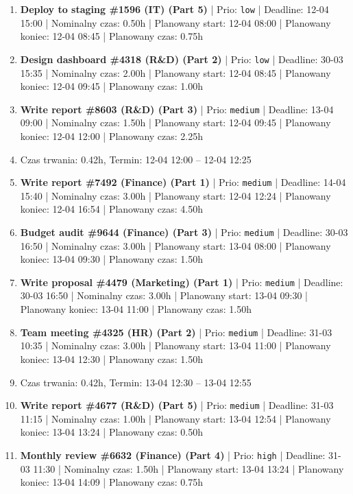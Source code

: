 {\begin{enumerate}
  \item [\textbf{14692}] \textbf{Deploy to staging \#1596 (IT) (Part 5)} | Prio: \texttt{low} | Deadline: 12-04 15:00 | Nominalny czas: 0.50h | Planowany start: 12-04 08:00 | Planowany koniec: 12-04 08:45 | Planowany czas: 0.75h
  \item [\textbf{14691}] \textbf{Design dashboard \#4318 (R\&D) (Part 2)} | Prio: \texttt{low} | Deadline: 30-03 15:35 | Nominalny czas: 2.00h | Planowany start: 12-04 08:45 | Planowany koniec: 12-04 09:45 | Planowany czas: 1.00h
  \item [\textbf{14634}] \textbf{Write report \#8603 (R\&D) (Part 3)} | Prio: \texttt{medium} | Deadline: 13-04 09:00 | Nominalny czas: 1.50h | Planowany start: 12-04 09:45 | Planowany koniec: 12-04 12:00 | Planowany czas: 2.25h
  \item [\textbf{PRZERWA}] Czas trwania: 0.42h, Termin: 12-04 12:00 -- 12-04 12:25
  \item [\textbf{14642}] \textbf{Write report \#7492 (Finance) (Part 1)} | Prio: \texttt{medium} | Deadline: 14-04 15:40 | Nominalny czas: 3.00h | Planowany start: 12-04 12:24 | Planowany koniec: 12-04 16:54 | Planowany czas: 4.50h
  \item [\textbf{14659}] \textbf{Budget audit \#9644 (Finance) (Part 3)} | Prio: \texttt{medium} | Deadline: 30-03 16:50 | Nominalny czas: 3.00h | Planowany start: 13-04 08:00 | Planowany koniec: 13-04 09:30 | Planowany czas: 1.50h
  \item [\textbf{14660}] \textbf{Write proposal \#4479 (Marketing) (Part 1)} | Prio: \texttt{medium} | Deadline: 30-03 16:50 | Nominalny czas: 3.00h | Planowany start: 13-04 09:30 | Planowany koniec: 13-04 11:00 | Planowany czas: 1.50h
  \item [\textbf{14641}] \textbf{Team meeting \#4325 (HR) (Part 2)} | Prio: \texttt{medium} | Deadline: 31-03 10:35 | Nominalny czas: 3.00h | Planowany start: 13-04 11:00 | Planowany koniec: 13-04 12:30 | Planowany czas: 1.50h
  \item [\textbf{PRZERWA}] Czas trwania: 0.42h, Termin: 13-04 12:30 -- 13-04 12:55
  \item [\textbf{14640}] \textbf{Write report \#4677 (R\&D) (Part 5)} | Prio: \texttt{medium} | Deadline: 31-03 11:15 | Nominalny czas: 1.00h | Planowany start: 13-04 12:54 | Planowany koniec: 13-04 13:24 | Planowany czas: 0.50h
  \item [\textbf{14615}] \textbf{Monthly review \#6632 (Finance) (Part 4)} | Prio: \texttt{high} | Deadline: 31-03 11:30 | Nominalny czas: 1.50h | Planowany start: 13-04 13:24 | Planowany koniec: 13-04 14:09 | Planowany czas: 0.75h

\end{enumerate}}
